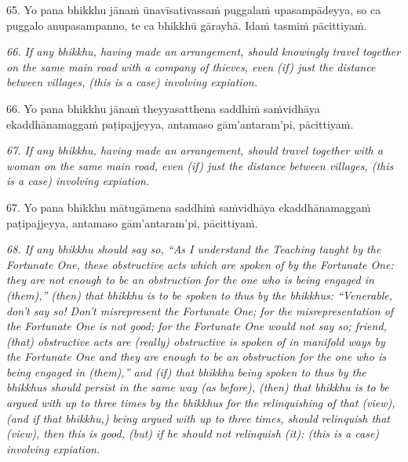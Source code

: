 \documentclass[11pt]{article}
\begin{document}
\begin{paracol}{2}
\begin{column}
\begin{flushleft}
65. Yo pana bhikkhu jānaṁ ūnavīsativassaṁ puggalaṁ upasampādeyya, so ca puggalo anupasampanno, te ca bhikkhū gārayhā. Idaṁ tasmiṁ pācittiyaṁ.
\switchcolumn*
\end{flushleft}

{\itshape\footnotesize
66. If any bhikkhu, having made an arrangement, should knowingly travel together on the same main road with a company of thieves, even (if) just the distance between villages, (this is a case) involving expiation.
}
\switchcolumn

\begin{flushleft}
66. Yo pana bhikkhu jānaṁ theyyasatthena saddhiṁ saṁvidhāya ekaddhānamaggaṁ paṭipajjeyya, antamaso gām’antaram’pi, pācittiyaṁ.
\switchcolumn*
\end{flushleft}

{\itshape\footnotesize
67. If any bhikkhu, having made an arrangement, should travel together with a woman on the same main road, even (if) just the distance between villages, (this is a case) involving expiation.
}
\switchcolumn

\begin{flushleft}
67. Yo pana bhikkhu mātugāmena saddhiṁ saṁvidhāya ekaddhānamaggaṁ paṭipajjeyya, antamaso gām’antaram’pi, pācittiyaṁ.
\switchcolumn*
\end{flushleft}

{\itshape\footnotesize
68. If any bhikkhu should say so, “As I understand the Teaching taught by the Fortunate One, these obstructive acts which are spoken of by the Fortunate One: they are not enough to be an obstruction for the one who is being engaged in (them),” (then) that bhikkhu is to be spoken to thus by the bhikkhus: “Venerable, don't say so! Don't misrepresent the Fortunate One; for the misrepresentation of the Fortunate One is not good; for the Fortunate One would not say so; friend, (that) obstructive acts are (really) obstructive is spoken of in manifold ways by the Fortunate One and they are enough to be an obstruction for the one who is being engaged in (them),” and (if) that bhikkhu being spoken to thus by the bhikkhus should persist in the same way (as before), (then) that bhikkhu is to be argued with up to three times by the bhikkhus for the relinquishing of that (view), (and if that bhikkhu,) being argued with up to three times, should relinquish that (view), then this is good, (but) if he should not relinquish (it): (this is a case) involving expiation.
}
\switchcolumn


\end{column}
\end{paracol}
\end{document}
